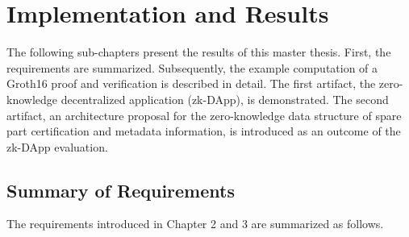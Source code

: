 \chapter{Implementation and Results}
The following sub-chapters present the results of this master thesis. First, the requirements are summarized. Subsequently, the example computation of a Groth16 proof and verification is described in detail. The first artifact, the zero-knowledge decentralized application (zk-DApp), is demonstrated. The second artifact, an architecture proposal for the zero-knowledge data structure of spare part certification and metadata information, is introduced as an outcome of the zk-DApp evaluation.

\section{Summary of Requirements}
The requirements introduced in Chapter 2 and 3 are summarized as follows.

